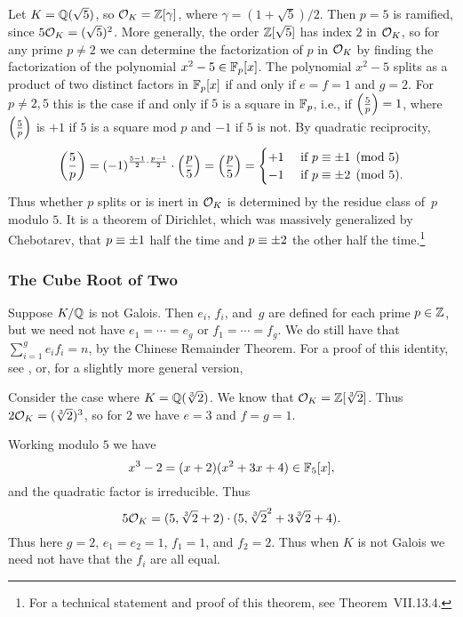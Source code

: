 \begin{example}\label{exam:decompQsqrt5}
	Let $K=\mathbb{Q}(\sqrt{5})$, so $\mathcal{O}_K=\mathbb{Z}[\gamma]$, where
	$\gamma=(1+\sqrt{5})/2$.  Then $p=5$ is ramified, since $5\mathcal{O}_K =
	(\sqrt{5})^2$.  More generally, the order $\mathbb{Z}[\sqrt{5}]$ has index $2$
	in $\mathcal{O}_K$, so for any prime $p\neq 2$ we can determine the
	factorization of $p$ in $\mathcal{O}_K$ by finding the factorization of the
	polynomial $x^2-5\in \mathbb{F}_p[x]$.  The polynomial $x^2-5$ splits as a
	product of two distinct factors in $\mathbb{F}_p[x]$ if and only if $e=f=1$
	and $g=2$.  For $p\neq 2,5$ this is the case if and only if $5$ is a
	square in $\mathbb{F}_p$, i.e., if $\left(\frac{5}{p}\right) = 1$, where $\left(\frac{5}{p}\right)$ is $+1$
	if $5$ is a square mod $p$ and $-1$ if $5$ is not.  By quadratic
	reciprocity,
	$$
		\left(\frac{5}{p}\right)
		= (-1)^{\frac{5-1}{2}\cdot \frac{p-1}{2}} \cdot \left(\frac{p}{5}\right)
		= \left(\frac{p}{5}\right)
		= \begin{cases}
			+1 & \text{ if } p\equiv \pm 1\pmod{5} \\
			-1 & \text{ if } p \equiv \pm 2\pmod{5}.
		\end{cases}
	$$
	Thus whether $p$ splits or is inert in
	$\mathcal{O}_K$ is determined by the residue class of~$p$
	modulo $5$.  It is a theorem of Dirichlet, which was massively
	generalized by Chebotarev, that $p\equiv \pm 1$ half the time
	and $p \equiv \pm 2$ the other half the time.\footnote{
	For a technical statement and proof of this theorem,
	see \cite{neukirch1999} Theorem~VII.13.4.}
\end{example}

\subsubsection*{The Cube Root of Two}

Suppose $K/\mathbb{Q}$ is not Galois.
Then $e_i$, $f_i$, and~$g$ are defined for each prime $p\in\mathbb{Z}$,
but we need not have $e_1=\cdots=e_g$ or $f_1=\cdots =f_g$.  We do still have that
$\sum_{i=1}^g e_i f_i = n$, by the Chinese Remainder Theorem.
For a proof of this identity, see \cite[Thm.~21]{marcus1977number},
or, for a slightly more general version, \cite[Prop.~I.8.2]{neukirch1999}

Consider the case where $K=\mathbb{Q}(\sqrt[3]{2})$. We know that $\mathcal{O}_K = \mathbb{Z}[\sqrt[3]{2}]$.  Thus
$2\mathcal{O}_K = (\sqrt[3]{2})^3$, so for $2$ we have $e=3$ and $f=g=1$.

Working modulo $5$ we have
$$
	x^3 - 2 = (x+2)(x^2+3x+4) \in \mathbb{F}_5[x],
$$
and the quadratic factor is irreducible.  Thus
$$
	5\mathcal{O}_K = (5, \sqrt[3]{2}+2)\cdot (5, \sqrt[3]{2}^2 + 3\sqrt[3]{2} + 4).
$$
Thus here $g=2$, $e_1=e_2=1$, $f_1=1$, and $f_2=2$.
Thus when $K$ is not Galois we need not have that the $f_i$
are all equal.

